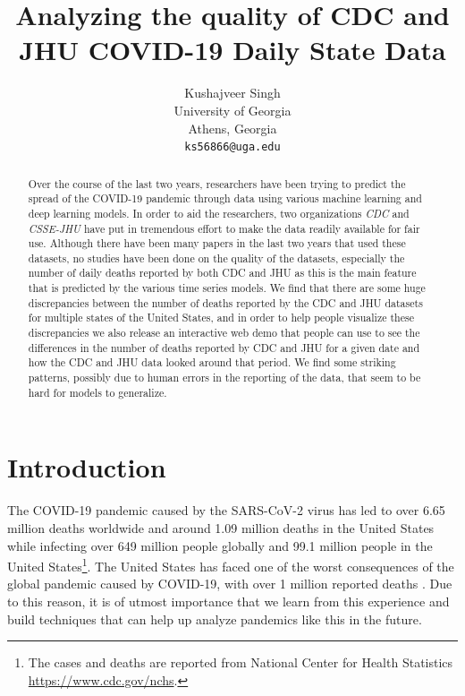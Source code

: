 \documentclass[11pt,twocolumn,letterpaper]{article}
\begin{document}
\title{Analyzing the quality of CDC and JHU COVID-19 Daily State Data}

\author{Kushajveer Singh\\
University of Georgia\\
Athens, Georgia\\
{\tt\small ks56866@uga.edu}
}
\maketitle

\begin{abstract}
   Over the course of the last two years, researchers have been trying to predict the spread of the COVID-19 pandemic through data using various machine learning and deep learning models. In order to aid the researchers, two organizations \emph{CDC} and \emph{CSSE-JHU} have put in tremendous effort to make the data readily available for fair use. Although there have been many papers in the last two years that used these datasets, no studies have been done on the quality of the datasets, especially the number of daily deaths reported by both CDC and JHU as this is the main feature that is predicted by the various time series models. We find that there are some huge discrepancies between the number of deaths reported by the CDC and JHU datasets for multiple states of the United States, and in order to help people visualize these discrepancies we also release an interactive web demo that people can use to see the differences in the number of deaths reported by CDC and JHU for a given date and how the CDC and JHU data looked around that period. We find some striking patterns, possibly due to human errors in the reporting of the data, that seem to be hard for models to generalize.
\end{abstract}

\section{Introduction}

The COVID-19 pandemic caused by the SARS-CoV-2 virus has led to over 6.65 million deaths worldwide and around 1.09 million deaths in the United States while infecting over 649 million people globally and 99.1 million people in the United States\footnote{The cases and deaths are reported from National Center for Health Statistics \href{https://www.cdc.gov/nchs/}{https://www.cdc.gov/nchs}.}. The United States has faced one of the worst consequences of the global pandemic caused by COVID-19, with over 1 million reported deaths \cite{ref1}. Due to this reason, it is of utmost importance that we learn from this experience and build techniques that can help up analyze pandemics like this in the future.
\end{document}
